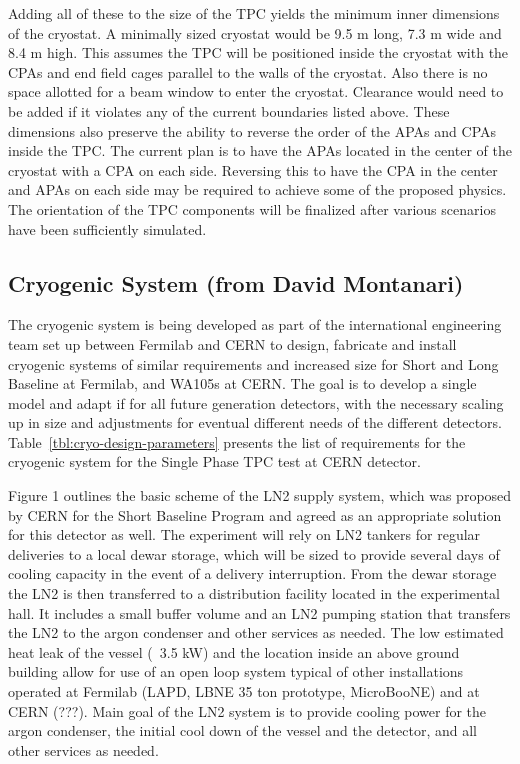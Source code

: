 Adding all of these to the size of the TPC yields the minimum inner dimensions of the cryostat.  A 
minimally sized cryostat would be 9.5 m long, 7.3 m wide and 8.4 m high.  This assumes the TPC will be 
positioned inside the cryostat with the CPAs and end field cages parallel to the walls of the cryostat.  Also 
there is no space allotted for a beam window to enter the cryostat.  Clearance would need to be added if 
it violates any of the current boundaries listed above.  
These dimensions also preserve the ability to reverse the order of the APAs and CPAs inside the TPC.  The 
current plan is to have the APAs located in the center of the cryostat with a CPA on each side.  Reversing 
this to have the CPA in the center and APAs on each side may be required to achieve some of the 
proposed physics.  The orientation of the TPC components will be finalized after various scenarios have 
been sufficiently simulated.  

\subsection{Cryogenic System (from David Montanari)}

The cryogenic system is being developed as part of the international engineering team set up between 
Fermilab and CERN to design, fabricate and install cryogenic systems of similar requirements and 
increased size for Short and Long Baseline at Fermilab, and WA105s at CERN. The goal is to develop a 
single model and adapt if for all future generation detectors, with the necessary scaling up in size and 
adjustments for eventual different needs of the different detectors. Table~\ref{tbl:cryo-design-parameters} presents the list of 
requirements for the cryogenic system for the Single Phase TPC test at CERN detector.

Figure 1 outlines the basic scheme of the LN2 supply system, which was proposed by CERN for the Short 
Baseline Program and agreed as an appropriate solution for this detector as well. The experiment will rely 
on LN2 tankers for regular deliveries to a local dewar storage, which will be sized to provide several days 
of cooling capacity in the event of a delivery interruption. From the dewar storage the LN2 is then 
transferred to a distribution facility located in the experimental hall. It includes a small buffer volume and 
an LN2 pumping station that transfers the LN2 to the argon condenser and other services as needed. The 
low estimated heat leak of the vessel (~3.5 kW) and the location inside an above ground building allow for 
use of an open loop system typical of other installations operated at Fermilab (LAPD, LBNE 35 ton 
prototype, MicroBooNE) and at CERN (???). 
Main goal of the LN2 system is to provide cooling power for the argon condenser, the initial cool down of 
the vessel and the detector, and all other services as needed.

